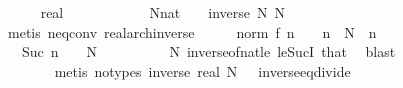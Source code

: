 \begin{isabellebody}
\ \ \isamarkupfalse%
\ {\isasymepsilon}\ {\isacharcolon}{\kern0pt}{\isacharcolon}{\kern0pt}\ {\isachardoublequoteopen}real{\isachardoublequoteclose}\isanewline
\ \ \isamarkupfalse%
\ {\isachardoublequoteopen}{\isasymepsilon}\ {\isachargreater}{\kern0pt}\ {}{\isachardoublequoteclose}\isanewline
\ \ \isamarkupfalse%
\ \isamarkupfalse%
\ N{\isacharcolon}{\kern0pt}{\isacharcolon}{\kern0pt}nat\ \ {\isachardoublequoteopen}{\isasymepsilon}\ {\isachargreater}{\kern0pt}\ inverse\ N{\isachardoublequoteclose}\ {\isachardoublequoteopen}N\ {\isachargreater}{\kern0pt}\ {}{\isachardoublequoteclose}\isanewline
\ \ \ \ \isamarkupfalse%
\ {\isacharparenleft}{\kern0pt}metis\ neq{}{\isacharunderscore}{\kern0pt}conv\ real{\isacharunderscore}{\kern0pt}arch{\isacharunderscore}{\kern0pt}inverse{\isacharparenright}{\kern0pt}\isanewline
\ \ \isamarkupfalse%
\ \isamarkupfalse%
\ {\isachardoublequoteopen}norm\ {\isacharparenleft}{\kern0pt}f\ n{\isacharparenright}{\kern0pt}\ {\isacharless}{\kern0pt}\ {\isasymepsilon}{\isachardoublequoteclose}\ \ {\isachardoublequoteopen}n\ {\isasymge}\ N{\isachardoublequoteclose}\ \ n\isanewline
\ \ \isamarkupfalse%
\ {\isacharminus}{\kern0pt}\isanewline
\ \ \ \ \isamarkupfalse%
\ {\isachardoublequoteopen}{}\ {\isacharslash}{\kern0pt}\ {\isacharparenleft}{\kern0pt}Suc\ n{\isacharparenright}{\kern0pt}\ {\isasymle}\ {}\ {\isacharslash}{\kern0pt}\ N{\isachardoublequoteclose}\isanewline
\ \ \ \ \ \ \isamarkupfalse%
\ {\isacartoucheopen}{}\ {\isacharless}{\kern0pt}\ N{\isacartoucheclose}\ inverse{\isacharunderscore}{\kern0pt}of{\isacharunderscore}{\kern0pt}nat{\isacharunderscore}{\kern0pt}le\ le{\isacharunderscore}{\kern0pt}SucI\ that\ \isamarkupfalse%
\ blast\isanewline
\ \ \ \ \isamarkupfalse%
\ \isamarkupfalse%
\ {\isachardoublequoteopen}{\isasymdots}\ {\isacharless}{\kern0pt}\ {\isasymepsilon}{\isachardoublequoteclose}\isanewline
\ \ \ \ \ \ \isamarkupfalse%
\ {\isacharparenleft}{\kern0pt}metis\ {\isacharparenleft}{\kern0pt}no{\isacharunderscore}{\kern0pt}types{\isacharparenright}{\kern0pt}\ {\isacartoucheopen}inverse\ {\isacharparenleft}{\kern0pt}real\ N{\isacharparenright}{\kern0pt}\ {\isacharless}{\kern0pt}\ {\isasymepsilon}{\isacartoucheclose}\ inverse{\isacharunderscore}{\kern0pt}eq{\isacharunderscore}{\kern0pt}divide{\isacharparenright}{\kern0pt}\isanewline

\end{isabellebody}

